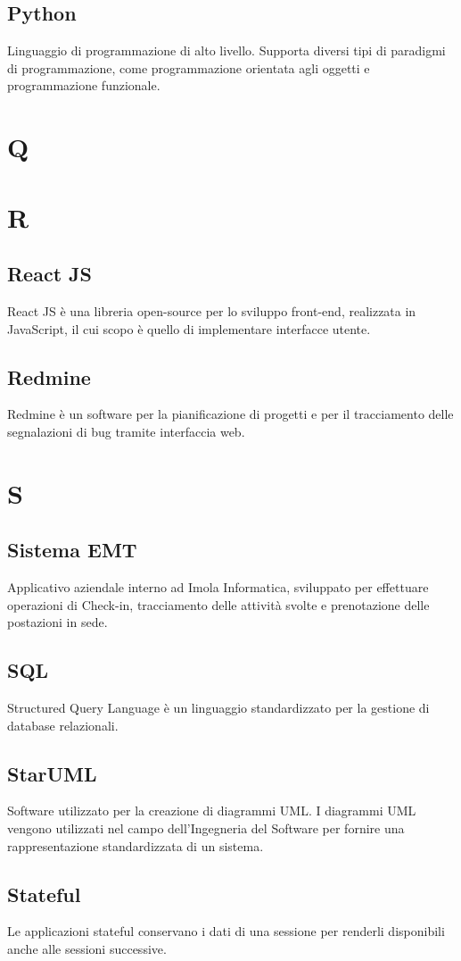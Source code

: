 \subsection{Python}
Linguaggio di programmazione di alto livello. Supporta diversi tipi di paradigmi di programmazione, come programmazione
orientata agli oggetti e programmazione funzionale.
\section{Q}
\section{R}
\subsection{React JS}
React JS è una libreria open-source per lo sviluppo front-end, realizzata in JavaScript, il cui scopo è quello di implementare interfacce utente.
\subsection{Redmine}
Redmine è un software per la pianificazione di progetti e per il tracciamento delle segnalazioni di bug tramite interfaccia web.
\newpage
\section{S}
\subsection{Sistema EMT}
Applicativo aziendale interno ad Imola Informatica, sviluppato per effettuare operazioni di Check-in, tracciamento delle attività svolte e prenotazione delle postazioni in sede.
\subsection{SQL}
Structured Query Language è un linguaggio standardizzato per la gestione di database relazionali.
\subsection{StarUML}
Software utilizzato per la creazione di diagrammi UML. I diagrammi UML vengono utilizzati nel campo dell'Ingegneria del Software per fornire una rappresentazione standardizzata di un sistema.
\subsection{Stateful}
Le applicazioni stateful conservano i dati di una sessione per renderli disponibili anche alle sessioni successive.
